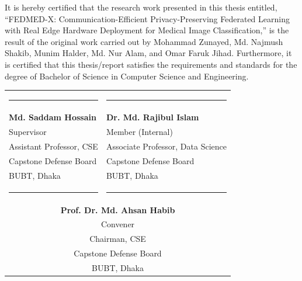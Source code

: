 \documentclass[12pt,a4paper]{report}
\begin{document}
It is hereby certified that the research work presented in this thesis entitled, ``FEDMED-X: Communication-Efficient Privacy-Preserving Federated Learning with Real Edge Hardware Deployment for Medical Image Classification,'' is the result of the original work carried out by Mohammad Zunayed, Md. Najmush Shakib, Munim Halder, Md. Nur Alam, and Omar Faruk Jihad. Furthermore, it is certified that this thesis/report satisfies the requirements and standards for the degree of Bachelor of Science in Computer Science and Engineering.

\vspace{2.5cm}

\noindent
\begin{tabularx}{\textwidth}{@{}X X@{}}
    \rule{6cm}{0.4pt} & \rule{6cm}{0.4pt} \\
    \textbf{Md. Saddam Hossain} & \textbf{Dr. Md. Rajibul Islam} \\
    Supervisor & Member (Internal) \\
    Assistant Professor, CSE & Associate Professor, Data Science \\
    Capstone Defense Board & Capstone Defense Board \\
    BUBT, Dhaka & BUBT, Dhaka \\[2cm]
    
    \rule{6cm}{0.4pt} & \rule{6cm}{0.4pt} \\
    \multicolumn{2}{c}{\textbf{Prof. Dr. Md. Ahsan Habib}} \\
    \multicolumn{2}{c}{Convener} \\
    \multicolumn{2}{c}{Chairman, CSE} \\
    \multicolumn{2}{c}{Capstone Defense Board} \\
    \multicolumn{2}{c}{BUBT, Dhaka} \\
\end{tabularx}

\clearpage

\end{document}
